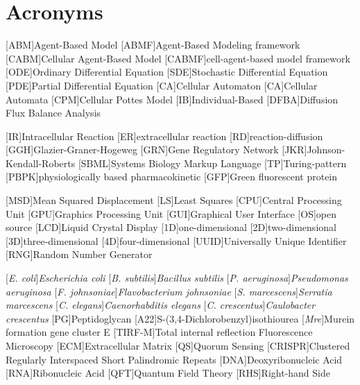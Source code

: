 \chapter*{Acronyms}
\begin{acronym}[\hspace{6em}]
    \setlength{\parskip}{0ex}
    \setlength{\itemsep}{0ex}
    [ABM]{Agent-Based Model}
    [ABMF]{Agent-Based Modeling framework}
    [CABM]{Cellular Agent-Based Model}
    [CABMF]{cell-agent-based model framework}
    [ODE]{Ordinary Differential Equation}
    [SDE]{Stochastic Differential Equation}
    [PDE]{Partial Differential Equation}
    [CA]{Cellular Automaton}
    [CA]{Cellular Automata}
    [CPM]{Cellular Pottes Model}
    [IB]{Individual-Based}
    [DFBA]{Diffusion Flux Balance Analysis}

    [IR]{Intracellular Reaction}
    [ER]{extracellular reaction}
    [RD]{reaction-diffusion}
    [GGH]{Glazier-Graner-Hogeweg}
    [GRN]{Gene Regulatory Network}
    [JKR]{Johnson-Kendall-Roberts}
    [SBML]{Systems Biology Markup Language}
    [TP]{Turing-pattern}
    [PBPK]{physiologically based pharmacokinetic}
    [GFP]{Green fluorescent protein}

    [MSD]{Mean Squared Displacement}
    [LS]{Least Squares}
    [CPU]{Central Processing Unit}
    [GPU]{Graphics Processing Unit}
    [GUI]{Graphical User Interface}
    [OS]{open source}
    [LCD]{Liquid Crystal Display}
    [1D]{one-dimensional}
    [2D]{two-dimensional}
    [3D]{three-dimensional}
    [4D]{four-dimensional}
    [UUID]{Universally Unique Identifier}
    [RNG]{Random Number Generator}

    [\textit{E. coli}]{\textit{Escherichia coli}}
    [\textit{B. subtilis}]{\textit{Bacillus subtilis}}
    [\textit{P. aeruginosa}]{\textit{Pseudomonas aeruginosa}}
    [\textit{F. johnsoniae}]{\textit{Flavobacterium johnsoniae}}
    [\textit{S. marcescens}]{\textit{Serratia marcescens}}
    [\textit{C. elegans}]{\textit{Caenorhabditis elegans}}
    [\textit{C. crescentus}]{\textit{Caulobacter crescentus}}
    [PG]{Peptidoglycan}
    [A22]{S-(3,4-Dichlorobenzyl)isothiourea}
    [\textit{Mre}]{Murein formation gene cluster E}
    [TIRF-M]{Total internal reflection Fluorescence Microscopy}
    [ECM]{Extracellular Matrix}
    [QS]{Quorum Sensing}
    [CRISPR]{Clustered Regularly Interspaced Short Palindromic Repeats}
    [DNA]{Deoxyribonucleic Acid}
    [RNA]{Ribonucleic Acid}
    [QFT]{Quantum Field Theory}
    [RHS]{Right-hand Side}
\end{acronym}
